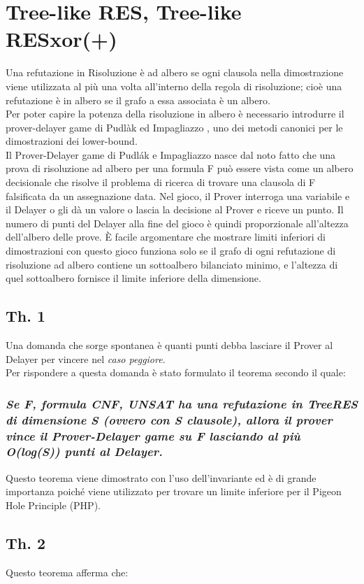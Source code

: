 \documentclass[it]{article}
\begin{document}
\section{Tree-like RES, Tree-like RESxor(+)}
Una refutazione in Risoluzione è ad albero se ogni clausola nella dimostrazione viene utilizzata al più una volta all’interno della regola di risoluzione; cioè una refutazione è in albero se il grafo a essa associata è un albero.\\
Per poter capire la potenza della risoluzione in albero è necessario introdurre il prover-delayer game di Pudlàk ed Impagliazzo \cite{10.5555/338219.338244}, uno dei metodi canonici per le dimostrazioni dei lower-bound.\\
Il Prover-Delayer game di Pudlák e Impagliazzo nasce dal noto fatto che una prova di risoluzione ad albero per una formula F può essere vista come un albero decisionale che risolve il problema di ricerca di trovare una clausola di F falsificata da un assegnazione data. Nel gioco, il Prover interroga una variabile e il Delayer o gli dà un valore o lascia la decisione al Prover e riceve un punto. Il numero di punti del Delayer alla fine del gioco è quindi proporzionale all'altezza dell'albero delle prove. È facile argomentare che mostrare limiti inferiori di dimostrazioni con questo gioco funziona solo se il grafo di ogni refutazione di risoluzione ad albero contiene un sottoalbero bilanciato minimo, e l'altezza di quel sottoalbero fornisce il limite inferiore della dimensione.\cite{BEYERSDORFF20101074}
    \subsection{Th. 1}
    Una domanda che sorge spontanea è quanti punti debba lasciare il Prover al Delayer per vincere nel \emph{caso peggiore}. \\
    Per rispondere a questa domanda è stato formulato il teorema secondo il quale:
        \subsubsection{\emph{Se F, formula CNF, UNSAT ha una refutazione in TreeRES di dimensione S (ovvero con S clausole), allora il prover vince il Prover-Delayer game su F lasciando al più O(log(S)) punti al Delayer.}} 
        Questo teorema viene dimostrato con l'uso dell'invariante ed è di grande importanza poiché viene utilizzato per trovare un limite inferiore per il Pigeon Hole Principle (PHP).
    \subsection{Th. 2}
    Questo teorema afferma che:
\end{document}
